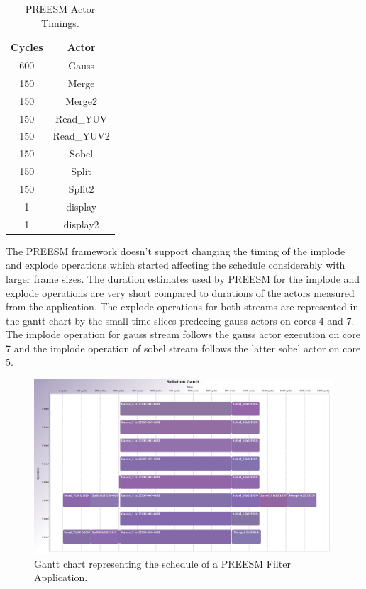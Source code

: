 \begin{table}
    \begin{center}
        \begin{tabular}{| c | c |}

            \hline
            Cycles & Actor \\ \hline
            600 & Gauss \\ \hline
            150 & Merge \\ \hline
            150 & Merge2 \\ \hline
            150 & Read\_YUV \\ \hline
            150 & Read\_YUV2 \\ \hline
            150 & Sobel \\ \hline
            150 & Split \\ \hline
            150 & Split2 \\ \hline
            1 & display \\ \hline
            1 & display2 \\ \hline
        \end{tabular}
        \caption{PREESM Actor Timings.}
        \label{tab:preesm_times}
    \end{center}
\end{table}

The PREESM framework doesn't support changing the timing of the implode and explode operations which started affecting the schedule considerably with larger frame sizes. The duration estimates used by PREESM for the implode and explode operations are very short compared to durations of the actors measured from the application. The explode operations for both streams are represented in the gantt chart by the small time slices predecing gauss actors on cores 4 and 7. The implode operation for gauss stream follows the gauss actor execution on core 7 and the implode operation of sobel stream follows the latter sobel actor on core 5.

\begin{figure}[h!]
    \begin{center}
        \includegraphics[width=0.99\textwidth]{images/gantt_preesm_cifcif.png}
        \caption{Gantt chart representing the schedule of a PREESM Filter Application.}
        \label{fig:preesm_gantt}
    \end{center}
\end{figure}

